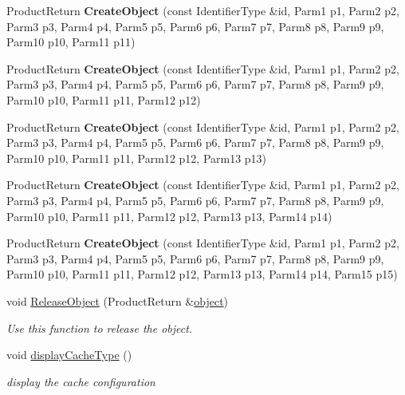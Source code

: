 \begin{DoxyCompactItemize}
\item 
\hypertarget{classLoki_1_1CachedFactory_af37ee6de86a4a1711dae05cdb879deb6}{}Product\+Return {\bfseries Create\+Object} (const Identifier\+Type \&id, Parm1 p1, Parm2 p2, Parm3 p3, Parm4 p4, Parm5 p5, Parm6 p6, Parm7 p7, Parm8 p8, Parm9 p9, Parm10 p10, Parm11 p11)\label{classLoki_1_1CachedFactory_af37ee6de86a4a1711dae05cdb879deb6}

\item 
\hypertarget{classLoki_1_1CachedFactory_a19dfe1c252f1f7e08da2fb54e8fd7b64}{}Product\+Return {\bfseries Create\+Object} (const Identifier\+Type \&id, Parm1 p1, Parm2 p2, Parm3 p3, Parm4 p4, Parm5 p5, Parm6 p6, Parm7 p7, Parm8 p8, Parm9 p9, Parm10 p10, Parm11 p11, Parm12 p12)\label{classLoki_1_1CachedFactory_a19dfe1c252f1f7e08da2fb54e8fd7b64}

\item 
\hypertarget{classLoki_1_1CachedFactory_ae3067a103cac7fe858ded09c4d72b01d}{}Product\+Return {\bfseries Create\+Object} (const Identifier\+Type \&id, Parm1 p1, Parm2 p2, Parm3 p3, Parm4 p4, Parm5 p5, Parm6 p6, Parm7 p7, Parm8 p8, Parm9 p9, Parm10 p10, Parm11 p11, Parm12 p12, Parm13 p13)\label{classLoki_1_1CachedFactory_ae3067a103cac7fe858ded09c4d72b01d}

\item 
\hypertarget{classLoki_1_1CachedFactory_a96f048f0680850edc311538b8ec4b768}{}Product\+Return {\bfseries Create\+Object} (const Identifier\+Type \&id, Parm1 p1, Parm2 p2, Parm3 p3, Parm4 p4, Parm5 p5, Parm6 p6, Parm7 p7, Parm8 p8, Parm9 p9, Parm10 p10, Parm11 p11, Parm12 p12, Parm13 p13, Parm14 p14)\label{classLoki_1_1CachedFactory_a96f048f0680850edc311538b8ec4b768}

\item 
\hypertarget{classLoki_1_1CachedFactory_ae9a8daab85331da17667040452cba7c1}{}Product\+Return {\bfseries Create\+Object} (const Identifier\+Type \&id, Parm1 p1, Parm2 p2, Parm3 p3, Parm4 p4, Parm5 p5, Parm6 p6, Parm7 p7, Parm8 p8, Parm9 p9, Parm10 p10, Parm11 p11, Parm12 p12, Parm13 p13, Parm14 p14, Parm15 p15)\label{classLoki_1_1CachedFactory_ae9a8daab85331da17667040452cba7c1}

\item 
void \hyperlink{classLoki_1_1CachedFactory_ac307db6556acef8179a260db4d573440}{Release\+Object} (Product\+Return \&\hyperlink{structobject}{object})
\begin{DoxyCompactList}\small\item\em Use this function to release the object. \end{DoxyCompactList}\item 
\hypertarget{classLoki_1_1CachedFactory_a26534687a259fa84dcbb21c388a72134}{}void \hyperlink{classLoki_1_1CachedFactory_a26534687a259fa84dcbb21c388a72134}{display\+Cache\+Type} ()\label{classLoki_1_1CachedFactory_a26534687a259fa84dcbb21c388a72134}

\begin{DoxyCompactList}\small\item\em display the cache configuration \end{DoxyCompactList}\end{DoxyCompactItemize}
